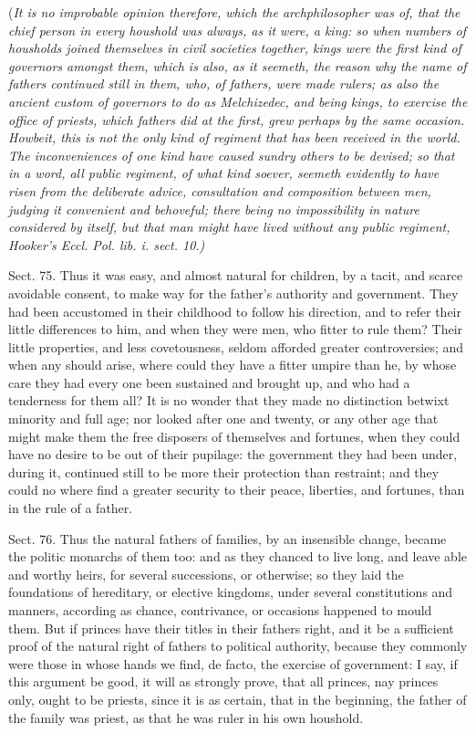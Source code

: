 \documentclass[11pt,openany]{book}
\begin{document}
(\emph{It is no improbable opinion therefore, which the archphilosopher was of, that the chief person in every houshold was always, as it were, a king: so when numbers of housholds joined themselves in civil societies together, kings were the first kind of governors amongst them, which is also, as it seemeth, the reason why the name of fathers continued still in them, who, of fathers, were made rulers; as also the ancient custom of governors to do as Melchizedec, and being kings, to exercise the office of priests, which fathers did at the first, grew perhaps by the same occasion. Howbeit, this is not the only kind of regiment that has been received in the world. The inconveniences of one kind have caused sundry others to be devised; so that in a word, all public regiment, of what kind soever, seemeth evidently to have risen from the deliberate advice, consultation and composition between men, judging it convenient and behoveful; there being no impossibility in nature considered by itself, but that man might have lived without any public regiment, Hooker's Eccl. Pol. lib. i. sect. 10.)}

Sect. 75. Thus it was easy, and almost natural for children, by a tacit, and scarce avoidable consent, to make way for the father's authority and government. They had been accustomed in their childhood to follow his direction, and to refer their little differences to him, and when they were men, who fitter to rule them? Their little properties, and less covetousness, seldom afforded greater controversies; and when any should arise, where could they have a fitter umpire than he, by whose care they had every one been sustained and brought up, and who had a tenderness for them all? It is no wonder that they made no distinction betwixt minority and full age; nor looked after one and twenty, or any other age that might make them the free disposers of themselves and fortunes, when they could have no desire to be out of their pupilage: the government they had been under, during it, continued still to be more their protection than restraint; and they could no where find a greater security to their peace, liberties, and fortunes, than in the rule of a father.

Sect. 76. Thus the natural fathers of families, by an insensible change, became the politic monarchs of them too: and as they chanced to live long, and leave able and worthy heirs, for several successions, or otherwise; so they laid the foundations of hereditary, or elective kingdoms, under several constitutions and manners, according as chance, contrivance, or occasions happened to mould them. But if princes have their titles in their fathers right, and it be a sufficient proof of the natural right of fathers to political authority, because they commonly were those in whose hands we find, de facto, the exercise of government: I say, if this argument be good, it will as strongly prove, that all princes, nay princes only, ought to be priests, since it is as certain, that in the beginning, the father of the family was priest, as that he was ruler in his own houshold.
\end{document}
